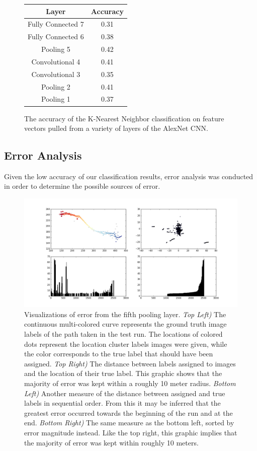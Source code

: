 \documentclass[letterpaper, 12 pt, conference]{ieeeconf}  %
\begin{document}
\begin{figure}[h]
\centering
\begin{tabular}{| c | c |}
\hline
\textbf{Layer} & \textbf{Accuracy} \\
\hline
Fully Connected 7 & 0.31 \\ 
Fully Connected 6 & 0.38 \\
Pooling 5 & 0.42 \\
Convolutional 4 & 0.41 \\
Convolutional 3 & 0.35 \\
Pooling 2 & 0.41 \\
Pooling 1 & 0.37 \\
\hline
\end{tabular}
\caption{The accuracy of the K-Nearest Neighbor classification on feature vectors pulled from a variety of layers of the AlexNet CNN. }
\label{classification_results}
\end{figure}

\subsection{Error Analysis}

Given the low accuracy of our classification results, error analysis was conducted in order to determine the possible sources of error. 

\begin{figure}[h]
\centering
\includegraphics[scale=0.36]{error_pool5}
\caption{Visualizations of error from the fifth pooling layer. \textit{Top Left)} The continuous multi-colored curve represents the ground truth image labels of the path taken in the test run. The locations of colored dots represent the location cluster labels images were given, while the color corresponds to the true label that should have been assigned. \textit{Top Right)} The distance between labels assigned to images and the location of their true label. This graphic shows that the majority of error was kept within a roughly 10 meter radius. \textit{Bottom Left)} Another measure of the distance between assigned and true labels in sequential order. From this it may be inferred that the greatest error occurred towards the beginning of the run and at the end. \textit{Bottom Right)} The same measure as the bottom left, sorted by error magnitude instead. Like the top right, this graphic implies that the majority of error was kept within roughly 10 meters.}
\label{error_graphs}
\end{figure}
\end{document}

